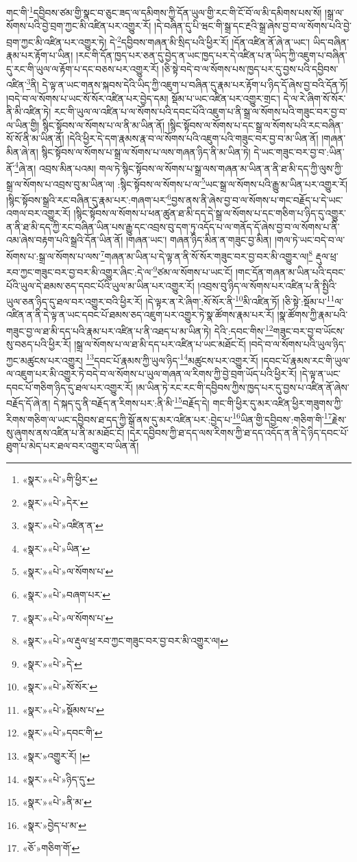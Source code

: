 གང་གི་\footnote{«སྣར་»«པེ་»གི་ཕྱིར་}དབྱིབས་ཙམ་གྱི་སྣང་བ་ཅུང་ཟད་ལ་དམིགས་ཀྱི་དོན་ཡུལ་གྱི་རང་གི་ངོ་བོ་ལ་མི་དམིགས་པས་སོ། །སྒྲ་ལ་སོགས་པའི་བྱེ་བྲག་ཀྱང་མི་འཛིན་པར་འགྱུར་རོ། །དེ་བཞིན་དུ་པི་ཝང་གི་སྒྲ་དང་རྔའི་སྒྲ་ཞེས་བྱ་བ་ལ་སོགས་པའི་བྱེ་བྲག་ཀྱང་མི་འཛིན་པར་འགྱུར་ཏེ། དེ་\footnote{«སྣར་»«པེ་»དེར་}དབྱིབས་གཞན་མི་སྲིད་པའི་ཕྱིར་རོ། །དོན་འཛིན་ནོ་ཞེ་ན་ཡང་། ཡིད་བཞིན་རྣམ་པར་རྟོག་པ་ཡིན། །རང་གི་དོན་ཁྱད་པར་ཅན་དུ་བྱེད་ན་ཡང་ཁྱད་པར་དེ་འཛིན་པ་ན་ཡིད་ཀྱི་འཇུག་པ་བཞིན་དུ་རང་གི་ཡུལ་ལ་རྟོག་པ་དང་བཅས་པར་འགྱུར་རོ། །ཅི་སྟེ་བདེ་བ་ལ་སོགས་པས་ཁྱད་པར་དུ་བྱས་པའི་དབྱིབས་འཛིན་\footnote{«སྣར་»«པེ་»འཛིན་ན་}ནི། དེ་ལྟ་ན་ཡང་གནས་སྐབས་དེའི་ཡིད་ཀྱི་འཇུག་པ་བཞིན་དུ་རྣམ་པར་རྟོག་པ་ཉིད་དོ་ཞེས་བྱ་བའི་དོན་ཏོ། །བདེ་བ་ལ་སོགས་པ་ཡང་སོ་སོར་འཛིན་པར་བྱེད་དམ། སྡོམ་པ་ཡང་འཛིན་པར་འགྱུར་གྲང་། དེ་ལ་རེ་ཞིག་སོ་སོར་ནི་མི་འཛིན་ཏེ། རང་གི་ཡུལ་ལ་འཛིན་པ་ལ་སོགས་པའི་དབང་པོའི་འཇུག་པ་ནི་སྒྲ་ལ་སོགས་པའི་གཟུང་བར་བྱ་བ་ལ་ཡིན་གྱི། སྙིང་སྟོབས་ལ་སོགས་པ་ལ་ནི་མ་ཡིན་ནོ། །སྙིང་སྟོབས་ལ་སོགས་པ་དང་སྒྲ་ལ་སོགས་པའི་རང་བཞིན་སོ་སོ་ནི་མ་ཡིན་ནོ། །དེའི་ཕྱིར་དེ་དག་རྣམས་རྣ་བ་ལ་སོགས་པའི་འཇུག་པའི་གཟུང་བར་བྱ་བ་མ་ཡིན་ནོ། །གཞན་མིན་ཞེ་ན། སྙིང་སྟོབས་ལ་སོགས་པ་སྒྲ་ལ་སོགས་པ་ལས་གཞན་ཉིད་ནི་མ་ཡིན་ཏེ། དེ་ཡང་གཟུང་བར་བྱ་བ་:ཡིན་ནོ་\footnote{«སྣར་»«པེ་»ཡིན་}ཞེ་ན། འབྲས་མིན་པའམ། གལ་ཏེ་སྙིང་སྟོབས་ལ་སོགས་པ་སྒྲ་ལས་གཞན་མ་ཡིན་ན་ནི་ཐ་མི་དད་ཀྱི་ལུས་ཀྱི་སྒྲ་ལ་སོགས་པ་འབྲས་བུ་མ་ཡིན་ལ། :སྙིང་སྟོབས་ལ་སོགས་པ་ལ་\footnote{«སྣར་»«པེ་»ལ་སོགས་པ་}ཡང་སྒྲ་ལ་སོགས་པའི་རྒྱུ་མ་ཡིན་པར་འགྱུར་རོ། །སྙིང་སྟོབས་སྒྲའི་རང་བཞིན་དུ་རྣམ་པར་:གཞག་པར་\footnote{«སྣར་»«པེ་»བཞག་པར་}བྱས་ནས་ནི་ཞེས་བྱ་བ་ལ་སོགས་པ་གང་བརྗོད་པ་དེ་ཡང་འགལ་བར་འགྱུར་རོ། །སྙིང་སྟོབས་ལ་སོགས་པ་ཕན་ཚུན་ཐ་མི་དད་དེ་སྒྲ་ལ་སོགས་པ་དང་གཅིག་པ་ཉིད་དུ་འགྱུར་ན་ནི་ཐ་མི་དད་ཀྱི་རང་བཞིན་ཡིན་པས་རྒྱུ་དང་འབྲས་བུ་དག་ཏུ་འདོད་པ་ལ་གནོད་དོ་ཞེས་བྱ་བ་ལ་སོགས་པ་ནི་འམ་ཞེས་བརྟག་པའི་སྒྲའི་དོན་ཡིན་ནོ། །གཞན་ཡང་། གཞན་ཉིད་མིན་ན་གཟུང་བྱ་མིན། །གལ་ཏེ་ཡང་བདེ་བ་ལ་སོགས་པ་:སྒྲ་ལ་སོགས་པ་ལས་\footnote{«སྣར་»«པེ་»ལ་སོགས་པ་}གཞན་མ་ཡིན་པ་དེ་ལྟ་ན་ནི་སོ་སོར་གཟུང་བར་བྱ་བར་མི་འགྱུར་ལ།\footnote{«སྣར་»«པེ་»ལ་རྡུལ་ཕྲ་རབ་ཀྱང་གཟུང་བར་བྱ་བར་མི་འགྱུར་ལ།} རྡུལ་ཕྲ་རབ་ཀྱང་གཟུང་བར་བྱ་བར་མི་འགྱུར་ཞིང་:དེ་ལ་\footnote{«སྣར་»«པེ་»དེ་}ཙམ་ལ་སོགས་པ་ཡང་ངོ། །གང་དོན་གཞན་མ་ཡིན་པའི་དབང་པོའི་ཡུལ་དེ་ཐམས་ཅད་དབང་པོའི་ཡུལ་མ་ཡིན་པར་འགྱུར་རོ། །འབྲས་བུ་ཉིད་ལ་སོགས་པར་འཛིན་པ་ནི་སྤྱིའི་ཡུལ་ཅན་ཉིད་དུ་ཐལ་བར་འགྱུར་བའི་ཕྱིར་རོ། །དེ་ལྟར་ན་རེ་ཞིག་:སོ་སོར་ནི་\footnote{«སྣར་»«པེ་»སོ་སོར་}མི་འཛིན་ཏོ། །ཅི་སྟེ་:སྡོམ་པ་\footnote{«སྣར་»«པེ་»སྡོམས་པ་}ལ་འཛིན་ན་ནི་དེ་ལྟ་ན་ཡང་དབང་པོ་ཐམས་ཅད་འཇུག་པར་འགྱུར་ཏེ་སྣ་ཚོགས་རྣམ་པར་རོ། །སྣ་ཚོགས་ཀྱི་རྣམ་པའི་གཟུང་བྱ་ལ་ཐ་མི་དད་པའི་རྣམ་པར་འཛིན་པ་ནི་འཐད་པ་མ་ཡིན་ཏེ། དེའི་:དབང་གིས་\footnote{«སྣར་»«པེ་»དབང་གི་}གཟུང་བར་བྱ་བ་ཡོངས་སུ་བཅད་པའི་ཕྱིར་རོ། །སྒྲ་ལ་སོགས་པ་ལ་ཐ་མི་དད་པར་འཛིན་པ་ཡང་མཐོང་ངོ། །བདེ་བ་ལ་སོགས་པའི་ཡུལ་ཉིད་ཀྱང་མཚུངས་པར་འགྱུར། \footnote{«སྣར་»འགྱུར་རོ། ། }དབང་པོ་རྣམས་ཀྱི་ཡུལ་ཉིད་\footnote{«སྣར་»«པེ་»ཉིད་དུ་}མཚུངས་པར་འགྱུར་རོ། །དབང་པོ་རྣམས་རང་གི་ཡུལ་ལ་འཇུག་པར་མི་འགྱུར་ཏེ་བདེ་བ་ལ་སོགས་པ་ཡུལ་གཞན་ལ་རིགས་ཀྱི་བྱེ་བྲག་ཡོད་པའི་ཕྱིར་རོ། །དེ་ལྟ་ན་ཡང་དབང་པོ་གཅིག་ཉིད་དུ་ཐལ་པར་འགྱུར་རོ། །མ་ཡིན་ཏེ་རང་རང་གི་དབྱིབས་ཀྱིས་ཁྱད་པར་དུ་བྱས་པ་འཛིན་ནོ་ཞེས་བརྗོད་དོ་ཞེ་ན། དེ་སྐད་དུ་ནི་བརྗོད་ན་རིགས་པར་:ནི་མི་\footnote{«སྣར་»«པེ་»ནི་མ་}བརྗོད་དེ། གང་གི་ཕྱིར་དུ་མར་འཛིན་ཕྱིར་གཟུགས་ཀྱི་རིགས་གཅིག་ལ་ཡང་དབྱིབས་ཐ་དད་ཀྱི་སྒོ་ནས་དུ་མར་འཛིན་པར་:བྱེད་པ་\footnote{«སྣར་»བྱེད་པ་མ་}ཡིན་གྱི་དབྱིབས་:གཅིག་གི་\footnote{«ཅོ་»གཅིག་གོ་}རྗེས་སུ་ཞུགས་ནས་འཛིན་པ་ནི་མ་མཐོང་ངོ། །དེར་དབྱིབས་ཀྱི་ཐ་དད་ལས་རིགས་ཀྱི་ཐ་དད་འདོད་ན་ནི་དེ་ཉིད་དབང་པོ་ཐུག་པ་མེད་པར་ཐལ་བར་འགྱུར་བ་ཡིན་ནོ། 